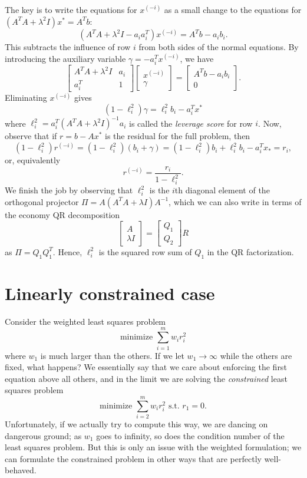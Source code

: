 \documentclass[12pt, leqno]{article} %
\begin{document}
The key is to write the equations for $x^{(-i)}$ as a small change to
the equations for $(A^T A + \lambda^2 I) x^* = A^T b$:
\[
  (A^T A + \lambda^2 I - a_i a_i^T) x^{(-i)} = A^T b - a_i b_i.
\]
This subtracts the influence of row $i$ from both sides of the normal
equations.  By introducing the auxiliary variable $\gamma = -a_i^T x^{(-i)}$,
we have
\[
  \begin{bmatrix}
    A^TA + \lambda^2 I & a_i \\
    a_i^T & 1
  \end{bmatrix}
  \begin{bmatrix} x^{(-i)} \\ \gamma \end{bmatrix} =
  \begin{bmatrix} A^T b - a_i b_i \\ 0 \end{bmatrix}.
\]
Eliminating $x^{(-i)}$ gives
\[
  (1-\ell_i^2) \gamma = \ell_i^2 b_i - a_i^T x^*
\]
where $\ell_i^2 = a_i^T (A^T A + \lambda^2 I)^{-1} a_i$ is called the
{\em leverage score} for row $i$.  Now, observe that
if $r = b-Ax^*$ is the residual for the full problem, then
\[
(1-\ell_i^2) r^{(-i)}
  = (1-\ell_i^2) (b_i + \gamma)
  = (1-\ell_i^2) b_i + \ell_i^2 b_i - a_i^T x_*
  = r_i,
\]
or, equivalently
\[
  r^{(-i)} = \frac{r_i}{1-\ell_i^2}.
\]
We finish the job by observing that $\ell_i^2$ is the $i$th diagonal
element of the orthogonal projector $\Pi = A(A^TA + \lambda I)A^{-1}$, which we
can also write in terms of the economy QR decomposition
\[
  \begin{bmatrix} A \\ \lambda I \end{bmatrix} =
  \begin{bmatrix} Q_1 \\ Q_2 \end{bmatrix} R
\]
as $\Pi = Q_1 Q_1^T$.  Hence, $\ell_i^2$ is the squared row sum of $Q_1$ in
the QR factorization.

\section{Linearly constrained case}

Consider the weighted least squares problem
\[
  \mbox{minimize } \sum_{i=1}^m w_i r_i^2
\]
where $w_1$ is much larger than the others.  If we
let $w_1 \rightarrow \infty$ while the others are fixed, what happens?
We essentially say that we care about enforcing the first equation
above all others, and in the limit we are solving the {\em constrained}
least squares problem
\[
  \mbox{minimize } \sum_{i=2}^m w_i r_i^2 \mbox{ s.t. } r_1 = 0.
\]
Unfortunately, if we actually try to compute this way, we are dancing on
dangerous ground; as $w_1$ goes to infinity, so does the condition
number of the least squares problem.  But this is only an issue with the
weighted formulation; we can formulate the constrained problem in other
ways that are perfectly well-behaved.
\end{document}
